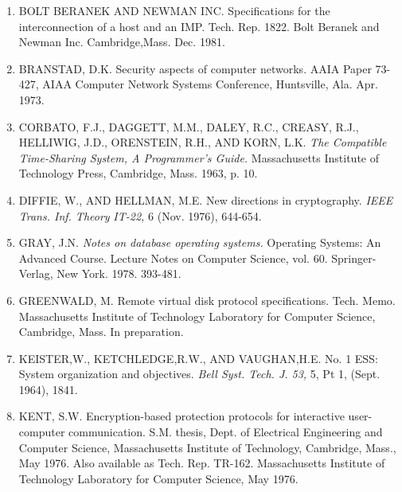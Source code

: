 \documentclass[a4paper,12pt,notitlepage,twoside,openright]{article}
\begin{document}
\begin{enumerate}
\def\labelenumi{\arabic{enumi}.}
\item

  BOLT BERANEK AND NEWMAN INC. Specifications for the interconnection of a
  host and an IMP. Tech. Rep. 1822. Bolt Beranek and Newman Inc.
  Cambridge,Mass. Dec. 1981.

\item

  BRANSTAD, D.K. Security aspects of computer networks. AAIA Paper 73-427,
  AIAA Computer Network Systems Conference, Huntsville, Ala. Apr. 1973.

\item

  CORBATO, F.J., DAGGETT, M.M., DALEY, R.C., CREASY, R.J., HELLIWIG,
  J.D., ORENSTEIN, R.H., AND KORN, L.K. \emph{The Compatible Time-Sharing System, A Programmer's
Guide.} Massachusetts
Institute of Technology Press, Cambridge, Mass. 1963, p. 10.

\item

  DIFFIE, W., AND HELLMAN, M.E. New directions in cryptography.
  \emph{IEEE Trans. Inf. Theory} \emph{IT-22,} 6 (Nov. 1976), 644-654.

\item

  GRAY, J.N. \emph{Notes on database operating systems.} Operating
  Systems: An Advanced Course. Lecture Notes on Computer Science, vol.
  60. Springer-Verlag, New York. 1978. 393-481.

\item

  GREENWALD, M. Remote virtual disk protocol specifications. Tech. Memo.
  Massachusetts Institute of Technology Laboratory for Computer
  Science, Cambridge, Mass. In preparation.

\item

  KEISTER,W., KETCHLEDGE,R.W., AND VAUGHAN,H.E. No. 1 ESS: System
  organization and objectives. \emph{Bell Syst. Tech. J. 53,} 5, Pt 1,
  (Sept. 1964), 1841.

\item

  KENT, S.W. Encryption-based protection protocols for interactive
  user-computer communication. S.M. thesis, Dept. of Electrical
  Engineering and Computer Science, Massachusetts Institute of
  Technology, Cambridge, Mass., May 1976. Also available as Tech. Rep.
  TR-162. Massachusetts Institute of Technology Laboratory for Computer
  Science, May 1976.


\end{enumerate}
\end{document}
